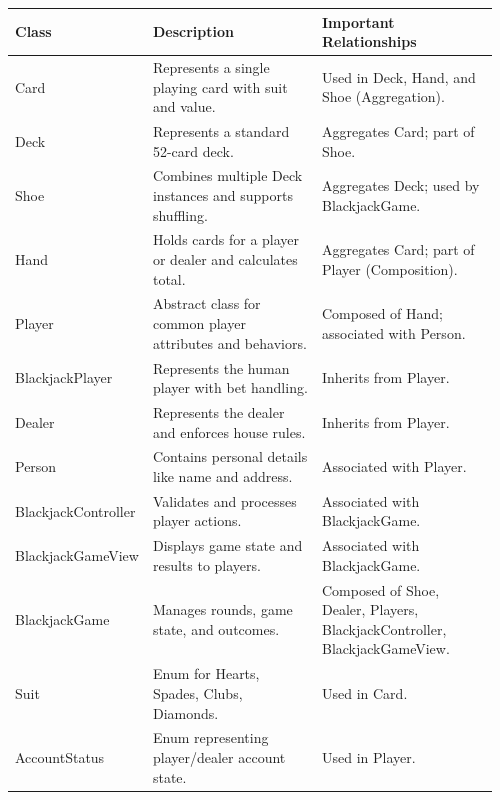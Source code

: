 \begin{center}
\begin{tabular}{|p{0.20\linewidth}|p{0.38\linewidth}|p{0.38\linewidth}|}
\hline
\textbf{Class} & \textbf{Description} & \textbf{Important Relationships} \\
\hline

Card & Represents a single playing card with suit and value. & Used in Deck, Hand, and Shoe (Aggregation). \\
\hline

Deck & Represents a standard 52-card deck. & Aggregates Card; part of Shoe. \\
\hline

Shoe & Combines multiple Deck instances and supports shuffling. & Aggregates Deck; used by BlackjackGame. \\
\hline

Hand & Holds cards for a player or dealer and calculates total. & Aggregates Card; part of Player (Composition). \\
\hline

Player & Abstract class for common player attributes and behaviors. & Composed of Hand; associated with Person. \\
\hline

BlackjackPlayer & Represents the human player with bet handling. & Inherits from Player. \\
\hline

Dealer & Represents the dealer and enforces house rules. & Inherits from Player. \\
\hline

Person & Contains personal details like name and address. & Associated with Player. \\
\hline

BlackjackController & Validates and processes player actions. & Associated with BlackjackGame. \\
\hline

BlackjackGameView & Displays game state and results to players. & Associated with BlackjackGame. \\
\hline

BlackjackGame & Manages rounds, game state, and outcomes. & Composed of Shoe, Dealer, Players, BlackjackController, BlackjackGameView. \\
\hline

Suit & Enum for Hearts, Spades, Clubs, Diamonds. & Used in Card. \\
\hline

AccountStatus & Enum representing player/dealer account state. & Used in Player. \\
\hline

\end{tabular}
\end{center}


